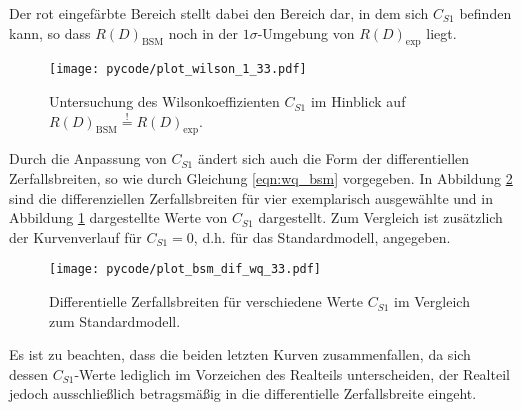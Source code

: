 Der rot eingefärbte Bereich  stellt dabei den Bereich dar, in dem sich $C_{S1}$ befinden kann, so dass $R(D)_{\text{BSM}}$ noch in der $\num{1}\sigma$-Umgebung von $R(D)_{\text{exp}}$ liegt.
\begin{figure}
  \centering
  \texttt{[image: pycode/plot\_wilson\_1\_33.pdf]}
  \caption{Untersuchung des Wilsonkoeffizienten $C_{S1}$ im Hinblick auf $R(D)_{\text{BSM}} \stackrel{!}{=} R(D)_{\text{exp}}$.}
  \label{fig:wilson_1}
\end{figure}
Durch die Anpassung von $C_{S1}$ ändert sich auch die Form der differentiellen Zerfallsbreiten, so wie durch Gleichung \eqref{eqn:wq_bsm} vorgegeben.
In Abbildung \ref{fig:wilson_2} sind die differenziellen Zerfallsbreiten für vier exemplarisch ausgewählte und in Abbildung \ref{fig:wilson_1} dargestellte Werte von $C_{S1}$ dargestellt.
Zum Vergleich ist zusätzlich der Kurvenverlauf für $C_{S1} = \num{0}$, d.h. für das Standardmodell, angegeben.
\begin{figure}
  \centering
  \texttt{[image: pycode/plot\_bsm\_dif\_wq\_33.pdf]}
  \caption{Differentielle Zerfallsbreiten für verschiedene Werte $C_{S1}$ im Vergleich zum Standardmodell.}
  \label{fig:wilson_2}
\end{figure}
Es ist zu beachten, dass die beiden letzten Kurven zusammenfallen, da sich dessen $C_{S1}$-Werte lediglich im Vorzeichen des Realteils unterscheiden, der Realteil jedoch ausschließlich betragsmäßig in die differentielle Zerfallsbreite eingeht.

